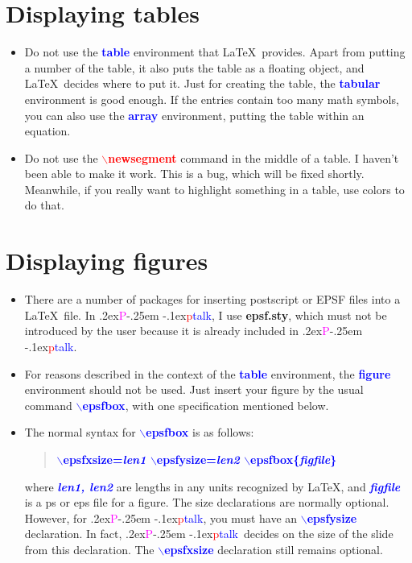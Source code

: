 \documentclass[12pt]{article}
\def\pptalk{{
\raise.2ex\hbox{\textcolor{magenta}P}\kern-.25em
\raise-.1ex\hbox{\textcolor{red}p}\textcolor{blue}{talk}}}
\def\ecomm#1{{\textcolor{blue}{$\backslash${\bf #1}}}}
\def\noncomm#1{{\textcolor{blue}{\bf #1}}}
\def\comm#1{{\textcolor{red}{$\backslash${\bf #1}}}}
\def\file#1{\textcolor{darkpurple}{\bf #1}}
\begin{document}
\endslide


\beginslide
\section{Displaying tables}
\begin{itemize}
\item Do not use the \noncomm{table} environment that \LaTeX\
provides.  Apart from putting a number of the table, it also puts the
table as a floating object, and \LaTeX\ decides where to put it.  Just
for creating the table, the \noncomm{tabular} environment is good enough.
If the entries contain too many math symbols, you can also use the
\noncomm{array} environment, putting the table within an equation.

\item Do not use the \comm{newsegment} command in the middle of a 
table.  I haven't been able to make it work.  This is a bug, which
will be fixed shortly.  Meanwhile, if you really want to highlight
something in a table, use colors to do that.

\end{itemize}

\endslide


\beginslide
\section{Displaying figures}
\begin{itemize}
\item There are a number of packages for inserting postscript or EPSF
files into a \LaTeX\ file.  In \pptalk, I use \file{epsf.sty}, which
must not be introduced by the user because it is already included in
\pptalk.  

\item  For reasons described in the context of the \noncomm{table}
environment,  the \noncomm{figure} environment should not be used.  
Just insert your figure by the usual command \ecomm{epsfbox}, with one
specification mentioned below.

\item The normal syntax for \ecomm{epsfbox} is as follows:
\begin{quote}
\noncomm{\ecomm{epsfxsize={\em len1}} \ecomm{epsfysize={\em len2}}
\ecomm{epsfbox\{{\em figfile}\}}}
\end{quote}
where \noncomm{\em len1, len2} are lengths in any units recognized by
\LaTeX, and \noncomm{\em figfile} is a ps or eps file for a figure.
The size declarations are normally optional.  However, for \pptalk,
you must have an \ecomm{epsfysize} declaration.  In fact, \pptalk\
decides on the size of the slide from this declaration.  The
\ecomm{epsfxsize} declaration still remains optional.

\end{itemize}
\end{document}
